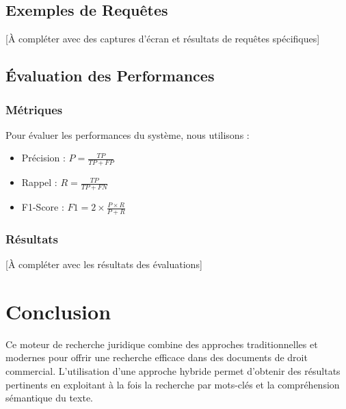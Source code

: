 \documentclass[12pt,a4paper]{article}
\begin{document}
\subsection{Exemples de Requêtes}
[À compléter avec des captures d'écran et résultats de requêtes spécifiques]

\subsection{Évaluation des Performances}
\subsubsection{Métriques}
Pour évaluer les performances du système, nous utilisons :
\begin{itemize}
    \item Précision : $P = \frac{TP}{TP + FP}$
    \item Rappel : $R = \frac{TP}{TP + FN}$
    \item F1-Score : $F1 = 2 \times \frac{P \times R}{P + R}$
\end{itemize}

\subsubsection{Résultats}
[À compléter avec les résultats des évaluations]

\section{Conclusion}
Ce moteur de recherche juridique combine des approches traditionnelles et modernes pour offrir une recherche efficace dans des documents de droit commercial. L'utilisation d'une approche hybride permet d'obtenir des résultats pertinents en exploitant à la fois la recherche par mots-clés et la compréhension sémantique du texte.
\end{document}
